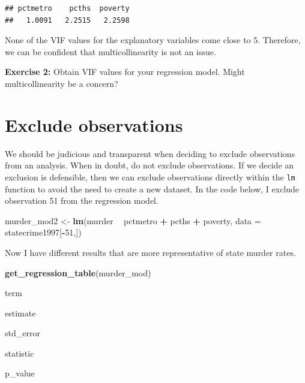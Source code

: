 \documentclass[
]{book}
\newenvironment{Shaded}{\begin{snugshade}}{\end{snugshade}}
\newcommand{\DataTypeTok}[1]{\textcolor[rgb]{0.13,0.29,0.53}{#1}}
\newcommand{\DecValTok}[1]{\textcolor[rgb]{0.00,0.00,0.81}{#1}}
\newcommand{\KeywordTok}[1]{\textcolor[rgb]{0.13,0.29,0.53}{\textbf{#1}}}
\newcommand{\NormalTok}[1]{#1}
\newcommand{\OperatorTok}[1]{\textcolor[rgb]{0.81,0.36,0.00}{\textbf{#1}}}
\newcommand{\StringTok}[1]{\textcolor[rgb]{0.31,0.60,0.02}{#1}}
\newenvironment{learncheck}%
{%
  \par\vspace{\baselineskip}\noindent 
  \color{Exercise}\begin{itshape}%
  \par\vspace{\baselineskip}\noindent\ignorespaces 
}%
{%
  \end{itshape}\ignorespacesafterend 
}
\begin{document}
\begin{verbatim}
## pctmetro    pcths  poverty 
##   1.0091   2.2515   2.2598
\end{verbatim}

None of the VIF values for the explanatory variables come close to 5. Therefore, we can be confident that multicollinearity is not an issue.

\begin{learncheck}
\textbf{Exercise 2:} Obtain VIF values for your regression model. Might
multicollinearity be a concern?
\end{learncheck}

\hypertarget{exclude-observations}{%
\section{Exclude observations}\label{exclude-observations}}

We should be judicious and transparent when deciding to exclude observations from an analysis. When in doubt, do not exclude observations. If we decide an exclusion is defensible, then we can exclude observations directly within the \texttt{lm} function to avoid the need to create a new dataset. In the code below, I exclude observation 51 from the regression model.

\begin{Shaded}
\begin{Highlighting}[]
\NormalTok{murder_mod2 <-}\StringTok{ }\KeywordTok{lm}\NormalTok{(murder }\OperatorTok{~}\StringTok{ }\NormalTok{pctmetro }\OperatorTok{+}\StringTok{ }\NormalTok{pcths }\OperatorTok{+}\StringTok{ }\NormalTok{poverty, }\DataTypeTok{data =}\NormalTok{ statecrime1997[}\OperatorTok{-}\DecValTok{51}\NormalTok{,])}
\end{Highlighting}
\end{Shaded}

Now I have different results that are more representative of state murder rates.

\begin{Shaded}
\begin{Highlighting}[]
\KeywordTok{get_regression_table}\NormalTok{(murder_mod)}
\end{Highlighting}
\end{Shaded}

term

estimate

std\_error

statistic

p\_value
\end{document}
